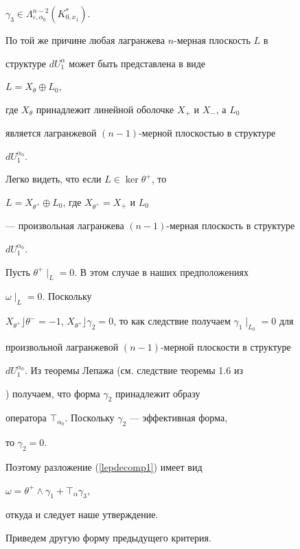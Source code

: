 \begin{pf}
$\gamma_3\in\Lambda_{\varepsilon,\alpha_0}^{n-2}(K_{0,x_1}^{*})$.


По той же причине любая лагранжева $n$-мерная плоскость $L$ в 


структуре $dU_1^\alpha $ может быть представлена в виде


$L=X_\theta \oplus L_0$, 


где $X_\theta $ принадлежит линейной оболочке $X_{+}$ и $X_{-}$, а $L_0$ 


является лагранжевой $(n{-}1)$-мерной плоскостью в структуре


$dU_1^{\alpha_0}$.





Легко видеть, что если $L\in {\ker}\theta^{+}$, то


$L=X_{\theta^{+}}\oplus L_0$, где $X_{\theta^{+}}=X_{+}$ и $L_0$


--- произвольная лагранжева $(n{-}1)$-мерная плоскость в структуре 


$dU_1^{\alpha_0}$.





Пусть $\theta^{+}\mid_L=0$. В этом случае в наших предположениях 


$\omega \mid_L=0$. Поскольку 


$X_{\theta^{+}}\rfloor \theta^{-}=-1$, $X_{\theta^{+}}\rfloor


\gamma_2=0$, то как следствие получаем $\gamma_1\mid_{L_0}=0$ для


произвольной лагранжевой $(n{-}1)$-мер\-ной плоскости в структуре 


$dU_1^{\alpha_0}$. Из теоремы Лепажа (см. следствие теоремы 1.6 из


\cite{lychagin2}) получаем, что форма $\gamma_2$ принадлежит образу


оператора $\top_{\alpha_0}$. Поскольку $\gamma_2$ --- эффективная форма,


то $\gamma_2=0$.


Поэтому разложение (\ref{lepdecomp1}) имеет вид


$\omega =\theta^{+}\wedge \gamma_1 +\top_\alpha \gamma_3$,


откуда и следует наше утверждение.


\end{pf}





Приведем другую форму предыдущего критерия. 





